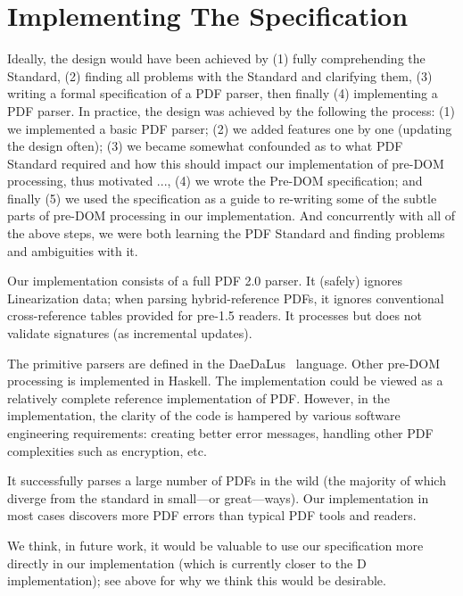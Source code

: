 \section{Implementing The Specification}
\label{sec:implementation}

Ideally, the design would have been achieved by
%
(1) fully comprehending the Standard,
(2) finding all problems with the Standard and clarifying them,
(3) writing a formal specification of a PDF parser,
then finally (4) implementing a PDF parser.
%
In practice, the design was achieved by the following the process:
%
(1) we implemented a basic PDF parser;
(2) we added features one by one (updating the design often);
(3) we became somewhat confounded as to what PDF Standard required
and how this should impact our implementation of pre-DOM processing, thus
motivated ...,
(4) we wrote the Pre-DOM specification; and finally
(5) we used the specification as a guide to re-writing some of
the subtle parts of pre-DOM processing in our implementation.
%
And concurrently with all of the above steps, we were both learning the PDF
Standard and finding problems and ambiguities with it.

Our implementation consists of a full PDF 2.0 parser.  It (safely) ignores
Linearization data;
%
when parsing hybrid-reference PDFs, it ignores conventional
cross-reference tables provided for pre-1.5 readers.
%
It processes but does not validate signatures (as incremental
updates).

The primitive parsers are defined in the DaeDaLus~\cite{daedalusrepo}
language.
%
Other pre-DOM processing is implemented in Haskell.
%
The implementation could be viewed as a relatively complete reference 
implementation of PDF.
However, in the implementation, 
the clarity of the code is hampered by various software engineering
requirements:
creating better error messages,
handling other PDF complexities such as encryption,
etc.

It successfully parses a large number of PDFs in the wild
(the majority of which diverge from the standard in small---or great---ways).
Our implementation in most cases discovers more PDF errors than
typical PDF tools and readers.

We think, in future work, it would be valuable to use our specification more
directly in our implementation (which is currently closer to the D
implementation);
%
see  above for why we think this would be
desirable.

% 
 
